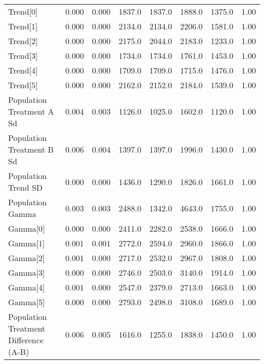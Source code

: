 \begin{tabular}{lrrrrrrr}
Trend[0]                              &      0.000 &    0.000 &    1837.0 &  1837.0 &    1888.0 &    1375.0 &   1.00 \\
Trend[1]                              &      0.000 &    0.000 &    2134.0 &  2134.0 &    2206.0 &    1581.0 &   1.00 \\
Trend[2]                              &      0.000 &    0.000 &    2175.0 &  2044.0 &    2183.0 &    1233.0 &   1.00 \\
Trend[3]                              &      0.000 &    0.000 &    1734.0 &  1734.0 &    1761.0 &    1453.0 &   1.00 \\
Trend[4]                              &      0.000 &    0.000 &    1709.0 &  1709.0 &    1715.0 &    1476.0 &   1.00 \\
Trend[5]                              &      0.000 &    0.000 &    2162.0 &  2152.0 &    2184.0 &    1539.0 &   1.00 \\
Population Treatment A Sd             &      0.004 &    0.003 &    1126.0 &  1025.0 &    1602.0 &    1120.0 &   1.00 \\
Population Treatment B Sd             &      0.006 &    0.004 &    1397.0 &  1397.0 &    1996.0 &    1430.0 &   1.00 \\
Population Trend SD                   &      0.000 &    0.000 &    1436.0 &  1290.0 &    1826.0 &    1661.0 &   1.00 \\
Population Gamma                      &      0.003 &    0.003 &    2488.0 &  1342.0 &    4643.0 &    1755.0 &   1.00 \\
Gamma[0]                              &      0.000 &    0.000 &    2411.0 &  2282.0 &    2538.0 &    1666.0 &   1.00 \\
Gamma[1]                              &      0.001 &    0.001 &    2772.0 &  2594.0 &    2960.0 &    1866.0 &   1.00 \\
Gamma[2]                              &      0.001 &    0.000 &    2717.0 &  2532.0 &    2967.0 &    1808.0 &   1.00 \\
Gamma[3]                              &      0.000 &    0.000 &    2746.0 &  2503.0 &    3140.0 &    1914.0 &   1.00 \\
Gamma[4]                              &      0.001 &    0.000 &    2547.0 &  2379.0 &    2713.0 &    1663.0 &   1.00 \\
Gamma[5]                              &      0.000 &    0.000 &    2793.0 &  2498.0 &    3108.0 &    1689.0 &   1.00 \\
Population Treatment Difference (A-B) &      0.006 &    0.005 &    1616.0 &  1255.0 &    1838.0 &    1450.0 &   1.00 \\

\end{tabular}
